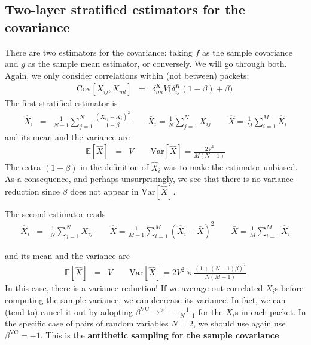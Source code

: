 \documentclass{aastex6}
\newcommand{\eqn}[1]{\begin{eqnarray}#1\end{eqnarray}}
\begin{document}
\subsection{Two-layer stratified estimators for the covariance}

There are two estimators for the covariance: taking $f$ as the sample covariance and $g$ as the sample mean estimator, or conversely. We will go through both. Again, we only consider correlations within (not between) packets:
\eqn{
	\mathrm{Cov}[X_{ij}, X_{ml}] &=& \delta^K_{im} V \bigl(\delta^K_{ij}(1-\beta) + \beta\bigr) \ 
}
The first stratified estimator is
\eqn{
	\hat{X}_i &=& \frac{1}{N-1}\sum_{j=1}^N \frac{(X_{ij} - \bar{X}_{i})^2}{1-\beta}	\quad\quad \bar{X}_{i}	=  \frac{1}{N}\sum_{j=1}^N X_{ij}	\quad\quad \hat{X} =  \frac{1}{M}\sum_{i=1}^M \hat{X}_i 
}
and its mean and the variance are
\eqn{
	\mathbb{E}[\hat{X}] 	&=&	V 	\quad \quad\mathrm{Var}[\hat{X}] = \frac{2V^2}{M(N-1)} 
}
The extra $ (1-\beta)$ in the definition of $\hat{X}_i$ was to make the estimator unbiased. As a consequence, and perhaps unsurprisingly, we see that there is no variance reduction since $\beta$ does not appear in $\mathrm{Var}[\hat{X}]$.

The second estimator reads
\eqn{
	\hat{X}_i &=& \frac{1}{N}\sum_{j=1}^N X_{ij}	\quad\quad
	\hat{X} =  \frac{1}{M-1}\sum_{i=1}^M (\hat{X}_i  - \bar{X})^2 \quad\quad
	\bar{X} =  \frac{1}{M}\sum_{i=1}^M \hat{X}_i
}

and its mean and the variance are
\eqn{
	\mathbb{E}[\hat{X}] &=& V \quad\quad
	 \mathrm{Var}[\hat{X}] = 2V^2 \times \frac{(1 + (N-1)\beta)^2}{N (M-1)}
}
In this case, there is a variance reduction! If we average out correlated $X_i$s before computing the sample variance, we can decrease its variance. In fact, we can (tend to) cancel it out by adopting $\beta^\mathrm{VC} \rightarrow^{>} - \ \frac{1}{N-1}$ for the $X_i$s in each packet. In the specific case of pairs of random variables $N=2$, we should use again use $\beta^\mathrm{VC} = -1$. This is the \textbf{antithetic sampling for the sample covariance}.
\end{document}

